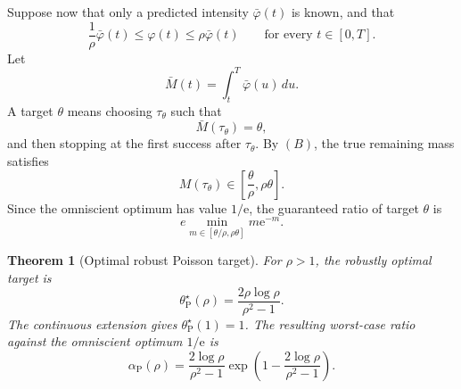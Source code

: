 \documentclass[11pt,a4paper]{article}
\newtheorem{theorem}{Theorem}
\newcommand{\e}{\mathrm e}
\begin{document}
Suppose now that only a predicted intensity \(\bar\varphi(t)\) is known, and that
\[
  \boxed{
  \frac1\rho\bar\varphi(t)\le\varphi(t)\le\rho\bar\varphi(t)
  }
  \qquad\text{for every }t\in[0,T].
  \tag{B}
\]
Let
\[
  \bar M(t)=\int_t^T\bar\varphi(u)\,du.
\]
A target \(\theta\) means choosing \(\tau_\theta\) such that
\[
  \bar M(\tau_\theta)=\theta,
\]
and then stopping at the first success after \(\tau_\theta\).  By \((B)\), the
true remaining mass satisfies
\[
  M(\tau_\theta)\in\left[\frac{\theta}{\rho},\rho\theta\right].
\]
Since the omniscient optimum has value \(1/\e\), the guaranteed ratio of target
\(\theta\) is
\[
  e\min_{m\in[\theta/\rho,\rho\theta]}m\e^{-m}.
\]

\begin{theorem}[Optimal robust Poisson target]
\label{thm:poisson-robust}
For \(\rho>1\), the robustly optimal target is
\[
  \boxed{
  \theta^\star_{\mathrm P}(\rho)
  =
  \frac{2\rho\log\rho}{\rho^2-1}.
  }
  \tag{9}
\]
The continuous extension gives \(\theta^\star_{\mathrm P}(1)=1\).  The resulting
worst-case ratio against the omniscient optimum \(1/\e\) is
\[
  \boxed{
  \alpha_{\mathrm P}(\rho)
  =
  \frac{2\log\rho}{\rho^2-1}
  \exp\left(1-\frac{2\log\rho}{\rho^2-1}\right).
  }
  \tag{10}
\]
\end{theorem}
\end{document}
